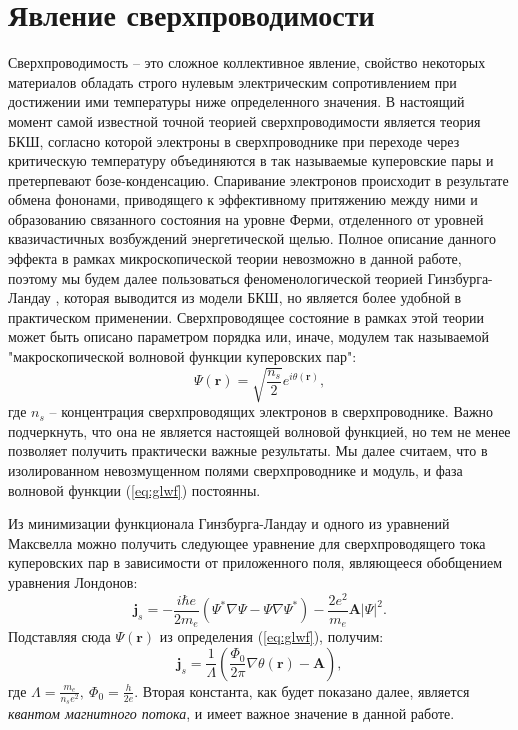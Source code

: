 \documentclass[12pt, twoside]{report}
\numberwithin{equation}{section}
\numberwithin{figure}{section}
\begin{document}
\section{Явление сверхпроводимости}
Сверхпроводимость -- это сложное коллективное явление, свойство некоторых материалов обладать строго нулевым электрическим сопротивлением при достижении ими температуры ниже определенного значения. В настоящий момент самой известной точной теорией сверхпроводимости является теория БКШ\cite{Schrieffer1999}, согласно которой электроны в сверхпроводнике при переходе через критическую температуру объединяются в так называемые куперовские пары и претерпевают бозе-конденсацию. Спаривание электронов происходит в результате обмена фононами, приводящего к эффективному притяжению между ними и образованию связанного состояния на уровне Ферми, отделенного от уровней квазичастичных возбуждений энергетической щелью. Полное описание данного эффекта в рамках микроскопической теории невозможно в данной работе, поэтому мы будем далее пользоваться феноменологической теорией Гинзбурга-Ландау \cite{GL1950}, которая выводится из модели БКШ\cite{Gorkov1959}, но является более удобной в практическом применении. Сверхпроводящее состояние в рамках этой теории может быть описано параметром порядка или, иначе, модулем так называемой "макроскопической волновой функции куперовских пар":
\begin{equation}
\Psi(\mathbf{r}) = \sqrt{\frac{n_s}{2}}e^{i\theta(\mathbf{r})},
\label{eq:glwf} 
\end{equation}
где $n_s$ -- концентрация сверхпроводящих электронов в сверхпроводнике. Важно подчеркнуть, что она не является настоящей волновой функцией, но тем не менее позволяет получить практически важные результаты. Мы далее считаем, что в изолированном невозмущенном полями сверхпроводнике и модуль, и фаза волновой функции (\ref{eq:glwf}) постоянны.

Из минимизации функционала Гинзбурга-Ландау и одного из уравнений Максвелла можно получить следующее уравнение для сверхпроводящего тока куперовских пар в зависимости от приложенного поля, являющееся обобщением уравнения Лондонов:
\begin{equation}
\mathbf{j}_s = -\frac{i\hbar e}{2m_e}(\Psi^*\nabla\Psi - \Psi\nabla\Psi^*) - \frac{2e^2}{m_e}\mathbf{A}|\Psi|^2.
\label{eq:lond}
\end{equation}
Подставляя сюда $\Psi(\mathbf{r})$ из определения (\ref{eq:glwf}), получим:
\begin{equation}
\mathbf{j}_s = \frac{1}{\Lambda}\left(\frac{\Phi_0}{2\pi}\nabla\theta(\mathbf{r})-\mathbf{A}\right),
\label{eq:lond2}
\end{equation}
где $\displaystyle \Lambda = \frac{m_e}{n_s e^2},\ \Phi_0 = \frac{h}{2e}$. Вторая константа, как будет показано далее, является \textit{квантом магнитного потока}, и имеет важное значение в данной работе.
\end{document}
